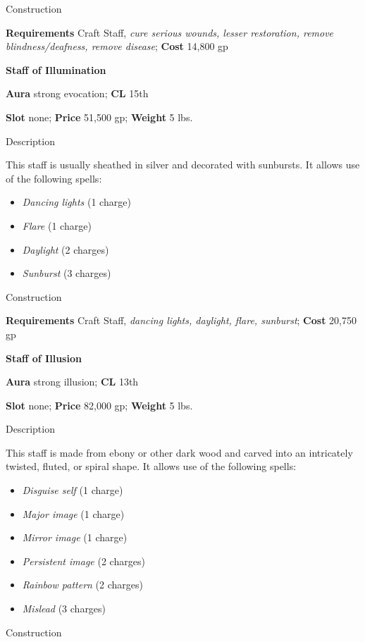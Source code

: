 Construction
				
\textbf{Requirements} Craft Staff, \textit{cure serious wounds, lesser restoration, remove blindness/deafness, remove disease};\textbf{ Cost }14,800 gp
				
\textbf{Staff of Illumination}
				
\textbf{Aura} strong evocation;\textbf{ CL }15th
				
\textbf{Slot} none; \textbf{Price} 51,500 gp; \textbf{Weight} 5 lbs.
				
Description
				
This staff is usually sheathed in silver and decorated with sunbursts. It allows use of the following spells:
				\begin{itemize}\item  \textit{Dancing lights} (1 charge)
				\item  \textit{Flare} (1 charge)
				\item  \textit{Daylight} (2 charges)
				\item  \textit{Sunburst} (3 charges) 
\end{itemize}
				
Construction
				
\textbf{Requirements} Craft Staff, \textit{dancing lights, daylight, flare, sunburst}; \textbf{Cost }20,750 gp
				
\textbf{Staff of Illusion}
				
\textbf{Aura} strong illusion; \textbf{CL} 13th
				
\textbf{Slot} none; \textbf{Price} 82,000 gp; \textbf{Weight} 5 lbs.
				
Description
				
This staff is made from ebony or other dark wood and carved into an intricately twisted, fluted, or spiral shape. It allows use of the following spells:
				\begin{itemize}\item  \textit{Disguise self} (1 charge)
				\item  \textit{Major image} (1 charge)
				\item  \textit{Mirror image} (1 charge)
				\item  \textit{Persistent image} (2 charges)
				\item  \textit{Rainbow pattern} (2 charges)
				\item  \textit{Mislead} (3 charges) 
\end{itemize}
				
Construction
				
